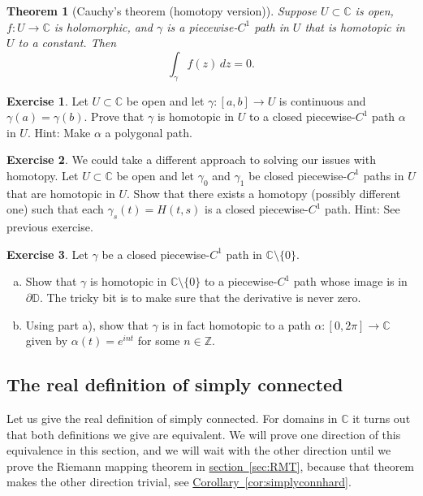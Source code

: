\documentclass[12pt,openany]{book}
\newcommand{\C}{{\mathbb{C}}}
\newcommand{\Z}{{\mathbb{Z}}}
\newcommand{\D}{{\mathbb{D}}}
\theoremstyle{plain}
\newtheorem{thm}{Theorem}[section]
\theoremstyle{remark}
\theoremstyle{definition}
\newenvironment{exbox}{%
    \def\FrameCommand{\vrule width 1pt \relax\hspace{10pt}}%
    \MakeFramed{\advance\hsize-\width\FrameRestore}%
}{%
    \endMakeFramed
}
\newenvironment{exparts}{%
    \leavevmode\begin{enumerate}[a),noitemsep,topsep=0pt,parsep=0pt,partopsep=0pt]
}{%
    \end{enumerate}
}
\theoremstyle{exercise}
\newtheorem{exercise}{Exercise}[section]
\theoremstyle{example}
\newcommand{\sectionref}[1]{\hyperref[#1]{section~\ref*{#1}}}
\newcommand{\corref}[1]{\hyperref[#1]{Corollary~\ref*{#1}}}
\begin{document}
\begin{thm}[Cauchy's theorem (homotopy version)]
\label{thm:cauchyhomotopy}%
%
Suppose $U \subset \C$ is open, $f \colon U \to \C$ is holomorphic,
and $\gamma$ is a piecewise-$C^1$ path in $U$ that is homotopic in $U$ to a
constant.  Then
\begin{equation*}
\int_{\gamma} f(z) \, dz = 0 .
\end{equation*}
\end{thm}

\begin{exbox}
\begin{exercise}
Let $U \subset \C$ be open and let $\gamma \colon [a,b] \to U$ is continuous
and $\gamma(a)=\gamma(b)$.  Prove that $\gamma$ is homotopic in $U$
to a closed piecewise-$C^1$ path $\alpha$ in $U$.
Hint: Make $\alpha$ a polygonal path.
\end{exercise}

\begin{exercise}
We could take a different approach to solving our issues with homotopy.  Let
$U \subset \C$ be open and let $\gamma_0$ and $\gamma_1$ be closed
piecewise-$C^1$ paths in $U$ that are homotopic in $U$.
Show that there exists a homotopy (possibly different one) such that
each $\gamma_s(t) = H(t,s)$ is a closed piecewise-$C^1$ path.
Hint: See previous exercise.
\end{exercise}

\begin{exercise}
\pagebreak[2]
Let $\gamma$ be a closed piecewise-$C^1$ path in $\C \setminus \{ 0 \}$.
\begin{exparts}
\item
Show that $\gamma$ is homotopic in $\C \setminus \{ 0 \}$ to
a piecewise-$C^1$ path whose image is in $\partial \D$.
The tricky bit is to make sure that the derivative is never zero.
\item
Using part a),
show that $\gamma$ is in fact homotopic to a path
$\alpha \colon [0,2\pi] \to \C$ given by $\alpha(t) = e^{int}$ for some
$n \in \Z$.
\end{exparts}
\end{exercise}
\end{exbox}

\subsection{The real definition of simply connected}

Let us give the real definition of simply connected.
For domains in $\C$ it
turns out that both definitions we give are equivalent.
We will prove one direction of this equivalence in this section,
and we will wait with the other direction until we prove the Riemann
mapping theorem in \sectionref{sec:RMT},
because that theorem makes the other direction trivial, see
\corref{cor:simplyconnhard}.
\end{document}
